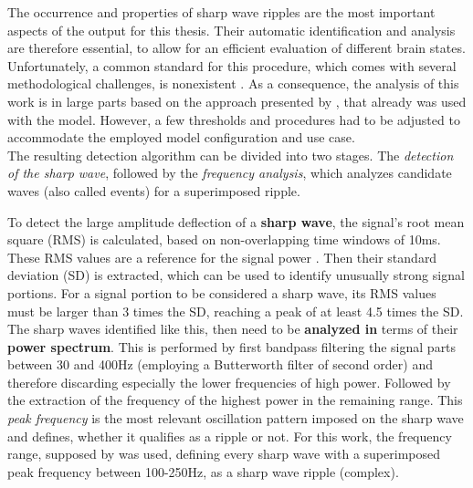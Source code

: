     The occurrence and properties of sharp wave ripples are the most important aspects of the output for this thesis. Their automatic identification and analysis are therefore essential, to allow for an efficient evaluation of different brain states. Unfortunately, a common standard for this procedure, which comes with several methodological challenges, is nonexistent \cite{Liu.2022}. As a consequence, the analysis of this work is in large parts based on the approach presented by \textcite{AmelieAussel.2020}, that already was used with the model. However, a few thresholds and procedures had to be adjusted to accommodate the employed model configuration and use case.\\
    The resulting detection algorithm can be divided into two stages. The \textit{detection of the sharp wave}, followed by the \textit{frequency analysis}, which analyzes candidate waves (also called events) for a superimposed ripple.
    
    To detect the large amplitude deflection of a \textbf{sharp wave}, the signal's root mean square (RMS) is calculated, based on non-overlapping time windows of 10ms. These RMS values are a reference for the signal power \cite{glaser.2012}. Then their standard deviation (SD) is extracted, which can be used to identify unusually strong signal portions. For a signal portion to be considered a sharp wave, its RMS values must be larger than 3 times the SD, reaching a peak of at least 4.5 times the SD.\\ 
    The sharp waves identified like this, then need to be \textbf{analyzed in} terms of their \textbf{power spectrum}. This is performed by first bandpass filtering the signal parts between 30 and 400Hz (employing a Butterworth filter of second order) and therefore discarding especially the lower frequencies of high power. Followed by the extraction of the frequency of the highest power in the remaining range. This \textit{peak frequency} is the most relevant oscillation pattern imposed on the sharp wave and defines, whether it qualifies as a ripple or not. For this work, the frequency range, supposed by \textcite{vanQuyen.2010} was used, defining every sharp wave with a superimposed peak frequency between 100-250Hz, as a sharp wave ripple (complex).
    

